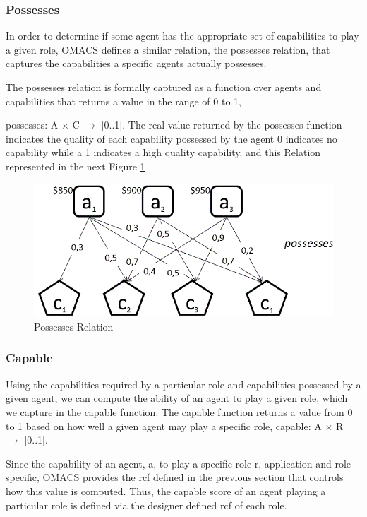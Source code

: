 \subsubsection{Possesses}
In order to determine if some agent has the appropriate set of capabilities to play a given role, OMACS defines a similar relation, the possesses relation, that captures the capabilities a specific agents actually possesses\cite{omacs4}.

The possesses relation is formally captured as a function over agents and capabilities that returns a value in the range of 0 to 1,

possesses: A $\times$ C $\rightarrow$ [0..1]. The real value returned by the possesses function indicates the quality of each capability possessed by the agent 0 indicates no capability while a 1 indicates a high quality capability\cite{omacs4}.
and this Relation represented in the next Figure \ref{fig:Possesses Relation}


\begin{figure}[th]
	\centering
		\includegraphics[scale=0.5]{ch1/img/RelPossess}
	\caption{\label{fig:Possesses Relation}Possesses Relation}
\end{figure}


\subsubsection{Capable}
Using the capabilities required by a particular role and capabilities possessed by a given agent, we can compute the ability of an agent to play a given role, which we capture in the capable function. The capable function returns a value from 0 to 1 based on how well a given agent may play a specific role, capable: A $\times$ R $\rightarrow$ {[}0..1{]}\cite{omacs2}.

Since the capability of an agent, a, to play a specific role  r, application and role specific, OMACS provides the rcf defined in the previous section that controls how this value is computed. Thus, the capable score of an agent playing a particular role is defined via the designer defined rcf of each role.

